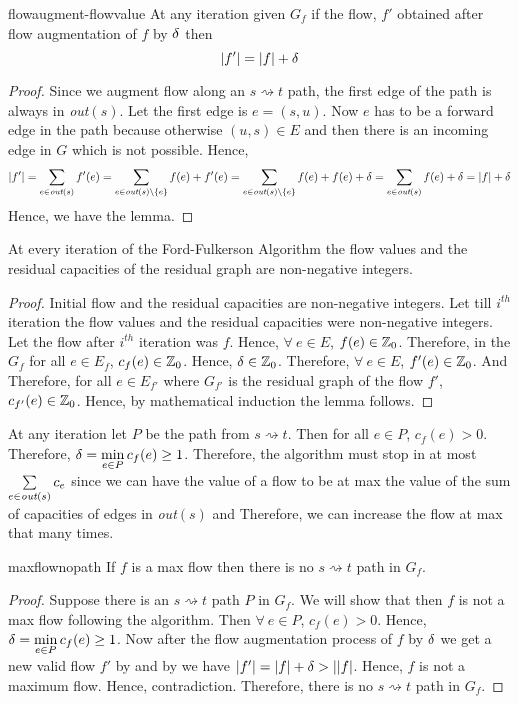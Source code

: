 \begin{lemma}{}{flowaugment-flowvalue}
	At any iteration given $G_f$ if the flow, $f'$ obtained after flow augmentation of $f$ by $\delta$ then $$|f'|=|f|+\delta$$
\end{lemma}
\begin{proof}
	Since we augment flow along an $s\rightsquigarrow t$ path, the first edge of the path is always in \emph{out}$(s)$. Let the first edge is $e=(s,u)$. Now $e$ has to be a forward edge in the path because otherwise $(u,s)\in E$ and then there is an incoming edge in $G$ which is not possible. Hence, $$|f'|=\sum\limits_{e\in \emph{out}(s)}f'(e)=\sum_{e\in \emph{out}(s)\setminus\{e\}}f(e)+f'(e)=\sum_{e\in \emph{out}(s)\setminus\{e\}}f(e)+f(e)+\delta=\sum_{e\in\emph{out}(s)}f(e)+\delta=|f|+\delta$$Hence, we have the lemma.
\end{proof}
\begin{lemma}{}{}
	At every iteration of the Ford-Fulkerson Algorithm the flow values and the residual capacities of the residual graph are non-negative integers.
\end{lemma}
\begin{proof}
	Initial flow and the residual capacities are non-negative integers. Let till $i^{th}$ iteration the flow values and the residual capacities were non-negative integers. Let the flow after $i^{th}$ iteration was $f$. Hence, $\forall\ e\in E$, $f(e)\in \mathbb{Z}_0$. Therefore, in the $G_f$ for all $e\in E_f$, $c_f(e)\in\mathbb{Z}_0$. Hence, $\delta\in\mathbb{Z}_0$. Therefore, $\forall\ e\in E$, $f'(e)\in\mathbb{Z}_0$. And Therefore, for all $e\in E_{f'}$ where $G_{f'}$ is the residual graph of the flow $f'$, $c_{f'}(e)\in\mathbb{Z}_0$. Hence, by mathematical induction the lemma follows.
\end{proof}
At any iteration let $P$ be the path from $s\rightsquigarrow t$. Then for all $e\in P$, $c_f(e)>0$. Therefore, $\delta=\min\limits_{e\in P}c_f(e)\geq 1$. Therefore, the algorithm must stop in at most $\sum\limits_{e\in \emph{out}(s)}c_e$ since we can have the value of a flow to be at max the value of the sum of capacities of edges in \emph{out}$(s)$ and Therefore, we can increase the flow at max that many times.
\begin{lemma}{}{maxflownopath}
	If $f$ is a max flow then there is no $s\rightsquigarrow t$ path in $G_f$.
\end{lemma}
\begin{proof}
	Suppose there is an $s\rightsquigarrow t$ path $P$ in $G_f$. We will show that then $f$ is not a max flow following the algorithm. Then $\forall\ e\in P$, $c_f(e)>0$. Hence, $\delta=\min\limits_{e\in P}c_f(e)\geq 1$. Now after the flow augmentation process of $f$ by $\delta$ we get a new valid flow $f'$ by  and by  we have $|f'|=|f|+\delta>||f|$. Hence, $f$ is not a maximum flow. Hence, contradiction. Therefore, there is no $s\rightsquigarrow t$ path in $G_f$.
\end{proof}
